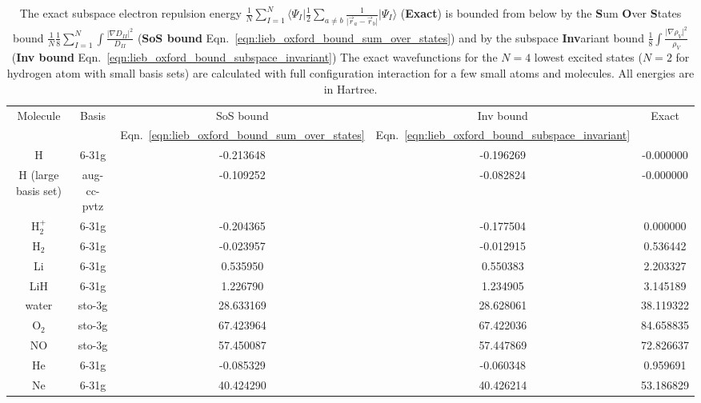 

\begin{table}
\begin{tabular}{
  SSSSS
  }
    \toprule
 {Molecule} & {Basis} & {SoS bound} & {Inv bound} & {Exact}\\
 & &  {Eqn.~\ref{eqn:lieb_oxford_bound_sum_over_states}} & {Eqn.~\ref{eqn:lieb_oxford_bound_subspace_invariant}} & \\
\midrule
{H} & {6-31g} & -0.213648 & -0.196269 & -0.000000 \\
{H (large basis set)} & {aug-cc-pvtz} & -0.109252 & -0.082824 & -0.000000 \\
{H$_2^+$} & {6-31g} & -0.204365 & -0.177504 & 0.000000 \\
{H$_2$} & {6-31g} & -0.023957 & -0.012915 & 0.536442 \\
{Li} & {6-31g} & 0.535950 & 0.550383 & 2.203327 \\
{LiH} & {6-31g} & 1.226790 & 1.234905 & 3.145189 \\
{water} & {sto-3g} & 28.633169 & 28.628061 & 38.119322 \\
{O$_2$} & {sto-3g} & 67.423964 & 67.422036 & 84.658835 \\
{NO} & {sto-3g} & 57.450087 & 57.447869 & 72.826637 \\
{He} & {6-31g} & -0.085329 & -0.060348 & 0.959691 \\
{Ne} & {6-31g} & 40.424290 & 40.426214 & 53.186829 \\
\bottomrule
\end{tabular}

\caption{
\label{tbl:lower_bounds_electron_repulsion}
\normalfont
The exact subspace electron repulsion energy
$\frac{1}{N} \sum_{I=1}^{N} \langle \Psi_I \vert \frac{1}{2} \sum_{a \neq b} \frac{1}{\vert \vec{r}_a - \vec{r}_b \vert} \vert \Psi_I \rangle$
(\textbf{Exact}) is bounded from below by
the \textbf{S}um \textbf{O}ver \textbf{S}tates bound $\frac{1}{N} \frac{1}{8} \sum_{I=1}^{N} \int \frac{\vert \nabla D_{II} \vert^2}{D_{II}}$
(\textbf{SoS bound} Eqn.~\ref{eqn:lieb_oxford_bound_sum_over_states}) and by the subspace \textbf{Inv}ariant bound
$\frac{1}{8} \int \frac{\vert \nabla \rho_V \vert^2}{\rho_V}$
(\textbf{Inv bound} Eqn.~\ref{eqn:lieb_oxford_bound_subspace_invariant})
The exact wavefunctions for the $N=4$ lowest excited states ($N=2$ for hydrogen atom with small basis sets)
are calculated with full configuration interaction for a few small atoms and molecules.
All energies are in Hartree.}
\end{table}
    
